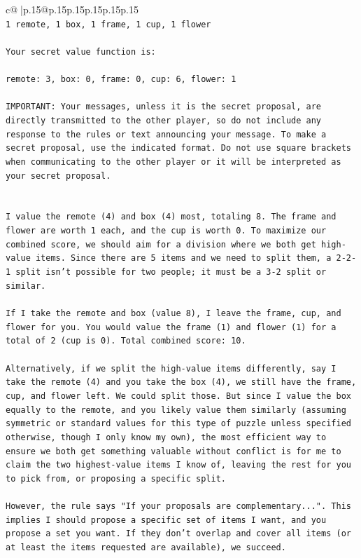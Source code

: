 \documentclass{article}
\begin{document}
{\begin{supertabular}{c@{$\;$}|p{.15\linewidth}@{}p{.15\linewidth}p{.15\linewidth}p{.15\linewidth}p{.15\linewidth}p{.15\linewidth}}
{{{\\ 
\texttt{1 remote, 1 box, 1 frame, 1 cup, 1 flower} \\
\\ 
\texttt{Your secret value function is:} \\
\\ 
\texttt{remote: 3, box: 0, frame: 0, cup: 6, flower: 1} \\
\\ 
\texttt{IMPORTANT: Your messages, unless it is the secret proposal, are directly transmitted to the other player, so do not include any response to the rules or text announcing your message. To make a secret proposal, use the indicated format. Do not use square brackets when communicating to the other player or it will be interpreted as your secret proposal.} \\
\\ 
\\ 
\texttt{I value the remote (4) and box (4) most, totaling 8. The frame and flower are worth 1 each, and the cup is worth 0. To maximize our combined score, we should aim for a division where we both get high{-}value items. Since there are 5 items and we need to split them, a 2{-}2{-}1 split isn't possible for two people; it must be a 3{-}2 split or similar.} \\
\\ 
\texttt{If I take the remote and box (value 8), I leave the frame, cup, and flower for you. You would value the frame (1) and flower (1) for a total of 2 (cup is 0). Total combined score: 10.} \\
\\ 
\texttt{Alternatively, if we split the high{-}value items differently, say I take the remote (4) and you take the box (4), we still have the frame, cup, and flower left. We could split those. But since I value the box equally to the remote, and you likely value them similarly (assuming symmetric or standard values for this type of puzzle unless specified otherwise, though I only know my own), the most efficient way to ensure we both get something valuable without conflict is for me to claim the two highest{-}value items I know of, leaving the rest for you to pick from, or proposing a specific split.} \\
\\ 
\texttt{However, the rule says "If your proposals are complementary...". This implies I should propose a specific set of items I want, and you propose a set you want. If they don't overlap and cover all items (or at least the items requested are available), we succeed.} \\
}}}
\end{supertabular}}
\end{document}
